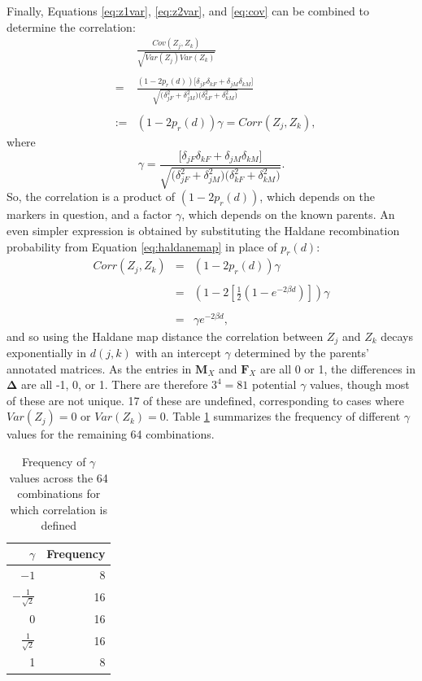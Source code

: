 \documentclass[sts]{imsart}
\newcommand{\m}[1]{\mathbf{#1}}               %
\newcommand{\sm}[1]{\boldsymbol{#1}}   %
\begin{document}
Finally, Equations \ref{eq:z1var}, \ref{eq:z2var}, and \ref{eq:cov} can be combined to determine the correlation:
\begin{eqnarray} \label{eq:precorr}
    & & \frac{Cov(Z_j, Z_k)}{\sqrt{Var(Z_j) Var(Z_k)}} \nonumber\\
    & & \nonumber\\
    & = & \frac{ (1 - 2 p_r(d)) \Big [ \delta_{jF} \delta_{kF} + \delta_{jM} \delta_{kM} \Big ] }{  \sqrt{ \big ( \delta_{jF}^2 + \delta_{jM}^2 \big ) \big ( \delta_{kF}^2 + \delta_{kM}^2 \big )}} \nonumber\\
    & & \nonumber \\
    & := & (1 - 2 p_r(d)) \gamma = Corr(Z_j, Z_k),
\end{eqnarray}
where
\begin{equation} \label{eq:gammaDef}
\gamma = \frac{ \Big [ \delta_{jF} \delta_{kF} + \delta_{jM} \delta_{kM} \Big ] }{  \sqrt{ \big ( \delta_{jF}^2 + \delta_{jM}^2 \big ) \big ( \delta_{kF}^2 + \delta_{kM}^2 \big )}}.
\end{equation}
So, the correlation is a product of $(1-2 p_r(d))$, which depends on the markers in question, and a factor $\gamma$, which depends on the known parents. An even simpler expression is obtained by substituting the Haldane recombination probability from Equation \ref{eq:haldanemap} in place of $p_r(d)$:
\begin{eqnarray} \label{eq:corrdist}
    Corr(Z_j, Z_k) & = & (1 - 2 p_r(d)) \gamma \nonumber\\
    & & \nonumber\\
    & = & \left ( 1 - 2 \left [ \frac{1}{2} \left ( 1 - e^{-2 \beta d} \right ) \right ] \right ) \gamma \nonumber\\
    & & \nonumber\\
    & = & \gamma e^{-2 \beta d},
\end{eqnarray}
and so using the Haldane map distance the correlation between $Z_j$ and $Z_k$ decays exponentially in $d(j,k)$ with an intercept $\gamma$ determined by the parents' annotated matrices. As the entries in $\m{M}_X$ and $\m{F}_X$ are all 0 or 1, the differences in $\sm{\Delta}$ are all -1, 0, or 1. There are therefore $3^4 = 81$ potential $\gamma$ values, though most of these are not unique. 17 of these are undefined, corresponding to cases where $Var(Z_j) = 0$ or $Var(Z_k) = 0$. Table \ref{tab:gammaSum} summarizes the frequency of different $\gamma$ values for the remaining 64 combinations.
\begin{table}[!h]
  \begin{tabular}{rr} \hline
    $\gamma$ & Frequency \\ \hline
    $-1$ & 8 \\
    $-\frac{1}{\sqrt{2}}$ & 16 \\
    0 & 16 \\
    $\frac{1}{\sqrt{2}}$ & 16 \\
    1 & 8 \\ \hline
  \end{tabular}
  \caption{Frequency of $\gamma$ values across the 64 combinations for which correlation is defined} \label{tab:gammaSum}
\end{table}
\end{document}
